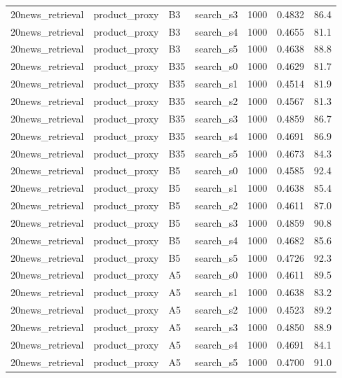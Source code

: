 \begin{longtable}{llllrrr}
20news\_retrieval & product\_proxy & B3 & search\_s3 & 1000 & 0.4832 & 86.4 \\
20news\_retrieval & product\_proxy & B3 & search\_s4 & 1000 & 0.4655 & 81.1 \\
20news\_retrieval & product\_proxy & B3 & search\_s5 & 1000 & 0.4638 & 88.8 \\
20news\_retrieval & product\_proxy & B35 & search\_s0 & 1000 & 0.4629 & 81.7 \\
20news\_retrieval & product\_proxy & B35 & search\_s1 & 1000 & 0.4514 & 81.9 \\
20news\_retrieval & product\_proxy & B35 & search\_s2 & 1000 & 0.4567 & 81.3 \\
20news\_retrieval & product\_proxy & B35 & search\_s3 & 1000 & 0.4859 & 86.7 \\
20news\_retrieval & product\_proxy & B35 & search\_s4 & 1000 & 0.4691 & 86.9 \\
20news\_retrieval & product\_proxy & B35 & search\_s5 & 1000 & 0.4673 & 84.3 \\
\rowcolor{oursbg}
20news\_retrieval & product\_proxy & B5 & search\_s0 & 1000 & 0.4585 & 92.4 \\
\rowcolor{oursbg}
20news\_retrieval & product\_proxy & B5 & search\_s1 & 1000 & 0.4638 & 85.4 \\
\rowcolor{oursbg}
20news\_retrieval & product\_proxy & B5 & search\_s2 & 1000 & 0.4611 & 87.0 \\
\rowcolor{oursbg}
20news\_retrieval & product\_proxy & B5 & search\_s3 & 1000 & 0.4859 & 90.8 \\
\rowcolor{oursbg}
20news\_retrieval & product\_proxy & B5 & search\_s4 & 1000 & 0.4682 & 85.6 \\
\rowcolor{oursbg}
20news\_retrieval & product\_proxy & B5 & search\_s5 & 1000 & 0.4726 & 92.3 \\
20news\_retrieval & product\_proxy & A5 & search\_s0 & 1000 & 0.4611 & 89.5 \\
20news\_retrieval & product\_proxy & A5 & search\_s1 & 1000 & 0.4638 & 83.2 \\
20news\_retrieval & product\_proxy & A5 & search\_s2 & 1000 & 0.4523 & 89.2 \\
20news\_retrieval & product\_proxy & A5 & search\_s3 & 1000 & 0.4850 & 88.9 \\
20news\_retrieval & product\_proxy & A5 & search\_s4 & 1000 & 0.4691 & 84.1 \\
20news\_retrieval & product\_proxy & A5 & search\_s5 & 1000 & 0.4700 & 91.0 \\
\bottomrule
\end{longtable}
\normalsize
